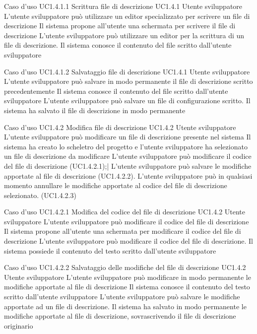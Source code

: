 \UCtitle
{Caso d'uso UC1.4.1.1}
{Scrittura file di descrizione}
\UC
{UC1.4.1}
{Utente sviluppatore}
{L'utente sviluppatore può utilizzare un editor specializzato per scrivere un file di descrizione}
{Il sistema propone all'utente una schermata per scrivere il file di descrizione}
\scenario
{L'utente sviluppatore può utilizzare un editor per la scrittura di un file di descrizione.}
\post
{Il sistema conosce il contenuto del file scritto dall'utente sviluppatore}

\UCtitle
{Caso d'uso UC1.4.1.2}
{Salvataggio file di descrizione}
\UC
{UC1.4.1}
{Utente sviluppatore}
{L'utente sviluppatore può salvare in modo permanente il file di descrizione scritto precedentemente}
{Il sistema conosce il contenuto del file scritto dall'utente sviluppatore}
\scenario
{L'utente sviluppatore può salvare un file di configurazione scritto.}
\post
{Il sistema ha salvato il file di descrizione in modo permanente}

\UCtitle
{Caso d'uso UC1.4.2}
{Modifica file di descrizione}
\UC
{UC1.4.2}
{Utente sviluppatore}
{L'utente sviluppatore può modificare un file di descrizione presente nel sistema}
{Il sistema ha creato lo scheletro del progetto e l'utente sviluppatore ha selezionato un file di descrizione da modificare}
\scenario
{L'utente sviluppatore può modificare il codice del file di descrizione (UC1.4.2.1);|
L'utente sviluppatore può salvare le modifiche apportate al file di descrizione (UC1.4.2.2).
}
\estensioni
{L'utente sviluppatore può in qualsiasi momento annullare le modifiche apportate al codice del file di descrizione selezionato. (UC1.4.2.3)
}

\UCtitle
{Caso d'uso UC1.4.2.1}
{Modifica del codice del file di descrizione}
\UC
{UC1.4.2}
{Utente sviluppatore}
{L'utente sviluppatore può modificare il codice del file di descrizione}
{Il sistema propone all'utente una schermata per modificare il codice del file di descrizione}
\scenario
{L'utente sviluppatore può modificare il codice del file di descrizione.}
\post
{Il sistema possiede il contenuto del testo scritto dall'utente sviluppatore}

\UCtitle
{Caso d'uso UC1.4.2.2}
{Salvataggio delle modifiche del file di descrizione}
\UC
{UC1.4.2}
{Utente sviluppatore}
{L'utente sviluppatore può modificare in modo permanente le modifiche apportate al file di descrizione}
{Il sistema conosce il contenuto del testo scritto dall'utente sviluppatore}
\scenario
{L'utente sviluppatore può salvare le modifiche apportate ad un file di descrizione.}
\post
{Il sistema ha salvato in modo permanente le modifiche apportate al file di descrizione, sovrascrivendo il file di descrizione originario}


